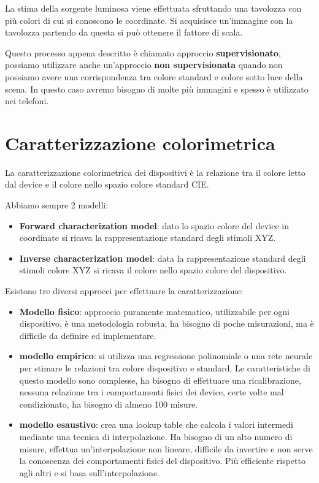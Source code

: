 La stima della sorgente luminosa viene effettuata sfruttando una tavolozza con
più colori di cui si conoscono le coordinate. Si acquisisce un'immagine con la
tavolozza partendo da questa si può ottenere il fattore di scala.

Questo processo appena descritto è chiamato approccio \textbf{supervisionato},
possiamo utilizzare anche un'approccio \textbf{non supervisionata} quando non
possiamo avere una corrispondenza tra colore standard e colore sotto luce della
scena. In questo caso avremo bisogno di molte più immagini e spesso è utilizzato nei
telefoni.
\section{Caratterizzazione colorimetrica}
La caratterizzazione colorimetrica dei dispositivi è la relazione tra il colore
letto dal device e il colore nello spazio colore standard CIE.

Abbiamo sempre 2 modelli:
\begin{itemize}
    \item \textbf{Forward characterization model}: dato lo spazio colore del device
          in coordinate si ricava la rappresentazione standard degli stimoli XYZ.
    \item \textbf{Inverse characterization model}: data la rappresentazione standard
          degli stimoli colore XYZ si ricava il colore nello spazio colore del dispositivo.
\end{itemize}

Esistono tre diversi approcci per effettuare la caratterizzazione:
\begin{itemize}
    \item \textbf{Modello fisico}: approccio puramente matematico, utilizzabile
          per ogni dispositivo, è una metodologia robusta, ha bisogno di poche
          misurazioni, ma è difficile da definire ed implementare.
    \item \textbf{modello empirico}: si utilizza una regressione polinomiale o
          una rete neurale per stimare le relazioni tra colore dispositivo e
          standard. Le caratteristiche di questo modello sono complesse, ha
          bisogno di effettuare una ricalibrazione, nessuna relazione tra i
          comportamenti fisici dei device, certe volte mal condizionato, ha
          bisogno di almeno 100 misure.
    \item \textbf{modello esaustivo}: crea una lookup table che calcola i valori
          intermedi mediante una tecnica di interpolazione. Ha bisogno di un alto
          numero di misure, effettua un'interpolazione non lineare, difficile da
          invertire e non serve la conoscenza dei comportamenti fisici del dispositivo.
          Più efficiente rispetto agli altri e si basa sull'interpolazione.
\end{itemize}

